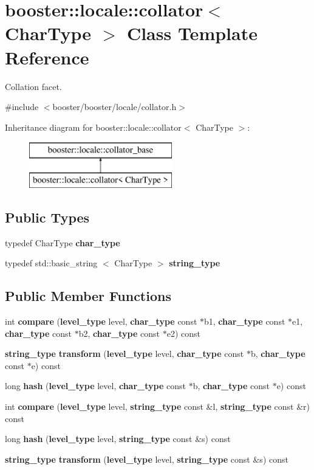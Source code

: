 \section{booster\-:\-:locale\-:\-:collator$<$ \-Char\-Type $>$ \-Class \-Template \-Reference}
\label{classbooster_1_1locale_1_1collator}


\-Collation facet.  




{\ttfamily \#include $<$booster/booster/locale/collator.\-h$>$}

\-Inheritance diagram for booster\-:\-:locale\-:\-:collator$<$ \-Char\-Type $>$\-:\begin{figure}[H]
\begin{center}
\leavevmode
\includegraphics[height=2.000000cm]{classbooster_1_1locale_1_1collator}
\end{center}
\end{figure}
\subsection*{\-Public \-Types}
\begin{DoxyCompactItemize}
\item 
typedef \-Char\-Type {\bf char\-\_\-type}
\item 
typedef std\-::basic\-\_\-string\*
$<$ \-Char\-Type $>$ {\bf string\-\_\-type}
\end{DoxyCompactItemize}
\subsection*{\-Public \-Member \-Functions}
\begin{DoxyCompactItemize}
\item 
int {\bf compare} ({\bf level\-\_\-type} level, {\bf char\-\_\-type} const $\ast$b1, {\bf char\-\_\-type} const $\ast$e1, {\bf char\-\_\-type} const $\ast$b2, {\bf char\-\_\-type} const $\ast$e2) const 
\item 
{\bf string\-\_\-type} {\bf transform} ({\bf level\-\_\-type} level, {\bf char\-\_\-type} const $\ast$b, {\bf char\-\_\-type} const $\ast$e) const 
\item 
long {\bf hash} ({\bf level\-\_\-type} level, {\bf char\-\_\-type} const $\ast$b, {\bf char\-\_\-type} const $\ast$e) const 
\item 
int {\bf compare} ({\bf level\-\_\-type} level, {\bf string\-\_\-type} const \&l, {\bf string\-\_\-type} const \&r) const 
\item 
long {\bf hash} ({\bf level\-\_\-type} level, {\bf string\-\_\-type} const \&s) const 
\item 
{\bf string\-\_\-type} {\bf transform} ({\bf level\-\_\-type} level, {\bf string\-\_\-type} const \&s) const 
\end{DoxyCompactItemize}
